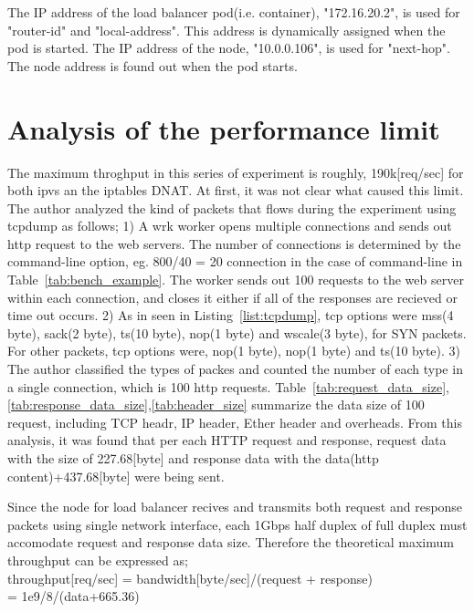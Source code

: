 The IP address of the load balancer pod(i.e. container), "172.16.20.2", is used for "router-id" and "local-address".
This address is dynamically assigned when the pod is started.
The IP address of the node, "10.0.0.106", is used for "next-hop".
The node address is found out when the pod starts.



\chapter{Analysis of the performance limit}
\label{appendix:performance_limit}

The maximum throghput in this series of experiment is roughly, 190k[req/sec] for both ipvs an the iptables DNAT.
At first, it was not clear what caused this limit.
The author analyzed the kind of packets that flows during the experiment using tcpdump\cite{jacobson1989tcpdump} as follows;
1) A wrk worker opens multiple connections and sends out http request to the web servers. The number of connections is determined by the command-line option, eg. 800/40 = 20 connection in the case of command-line in Table~\ref{tab:bench_example}. The worker sends out 100 requests to the web server within each connection, and closes it either if all of the responses are recieved or time out occurs.
2) As in seen in Listing~\ref{list:tcpdump}, tcp options were mss(4 byte), sack(2 byte), ts(10 byte), nop(1 byte) and wscale(3 byte), for SYN packets. For other packets, tcp options were, nop(1 byte), nop(1 byte) and ts(10 byte).
3) The author classified the types of packes and counted the number of each type in a single connection, which is 100 http requests. Table~\ref{tab:request_data_size},\ref{tab:response_data_size},\ref{tab:header_size} summarize the data size of 100 request, including TCP headr, IP header, Ether header and overheads. 
From this analysis, it was found that per each HTTP request and response,
request data with the size of 227.68[byte] and response data with the data(http content)+437.68[byte] were being sent.   

Since the node for load balancer recives and transmits both request and response packets using single network interface, each 1Gbps half duplex of full duplex must accomodate request and response data size.
Therefore the theoretical maximum throughput can be expressed as; \\
throughput[req/sec] = bandwidth[byte/sec]/(request + response) \\
= 1e9/8/(data+665.36)

